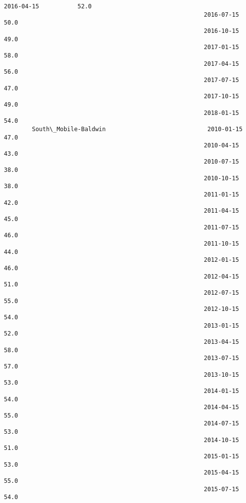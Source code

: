 \documentclass[11pt]{article}
\begin{document}
\begin{Verbatim}[commandchars=\\\{\}]
                                                         2016-04-15           52.0   
                                                         2016-07-15           50.0   
                                                         2016-10-15           49.0   
                                                         2017-01-15           58.0   
                                                         2017-04-15           56.0   
                                                         2017-07-15           47.0   
                                                         2017-10-15           49.0   
                                                         2018-01-15           54.0   
        South\_Mobile-Baldwin                             2010-01-15           47.0   
                                                         2010-04-15           43.0   
                                                         2010-07-15           38.0   
                                                         2010-10-15           38.0   
                                                         2011-01-15           42.0   
                                                         2011-04-15           45.0   
                                                         2011-07-15           46.0   
                                                         2011-10-15           44.0   
                                                         2012-01-15           46.0   
                                                         2012-04-15           51.0   
                                                         2012-07-15           55.0   
                                                         2012-10-15           54.0   
                                                         2013-01-15           52.0   
                                                         2013-04-15           58.0   
                                                         2013-07-15           57.0   
                                                         2013-10-15           53.0   
                                                         2014-01-15           54.0   
                                                         2014-04-15           55.0   
                                                         2014-07-15           53.0   
                                                         2014-10-15           51.0   
                                                         2015-01-15           53.0   
                                                         2015-04-15           55.0   
                                                         2015-07-15           54.0   

\end{Verbatim}
\end{document}

